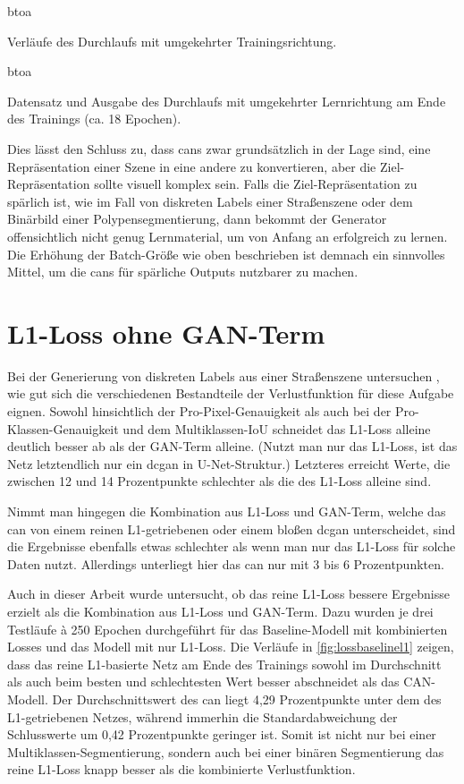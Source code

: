 \begin{losseswoiou}{btoa}
	\caption{Verläufe des Durchlaufs mit umgekehrter Trainingsrichtung.}
	\label{fig:lossbtoa}
\end{losseswoiou}

\begin{outputs}{btoa}
	\caption{Datensatz und Ausgabe des Durchlaufs mit umgekehrter Lernrichtung am Ende des Trainings (ca. 18 Epochen).}
	\label{fig:outputsbtoa}
\end{outputs}

Dies lässt den Schluss zu, dass \glspl{can} zwar grundsätzlich in der Lage sind, eine Repräsentation einer Szene in eine andere zu konvertieren, aber die Ziel-Repräsentation sollte visuell komplex sein.
Falls die Ziel-Repräsentation zu spärlich ist, wie im Fall von diskreten Labels einer Straßenszene oder dem Binärbild einer Polypensegmentierung, dann bekommt der Generator offensichtlich nicht genug Lernmaterial, um von Anfang an erfolgreich zu lernen.
Die Erhöhung der Batch-Größe wie oben beschrieben ist demnach ein sinnvolles Mittel, um die \glspl{can} für spärliche Outputs nutzbarer zu machen.



\section{L1-Loss ohne GAN-Term}

Bei der Generierung von diskreten Labels aus einer Straßenszene untersuchen \citeauthor{Isola.2017}, wie gut sich die verschiedenen Bestandteile der Verlustfunktion für diese Aufgabe eignen.
Sowohl hinsichtlich der Pro-Pixel-Genauigkeit als auch bei der Pro-Klassen-Genauigkeit und dem Multiklassen-IoU schneidet das L1-Loss alleine deutlich besser ab als der GAN-Term alleine.
(Nutzt man nur das L1-Loss, ist das Netz letztendlich nur ein \gls{dcgan} in U-Net-Struktur.)
Letzteres erreicht Werte, die zwischen 12 und 14 Prozentpunkte schlechter als die des L1-Loss alleine sind.

Nimmt man hingegen die Kombination aus L1-Loss und GAN-Term, welche das \gls{can} von einem reinen L1-getriebenen oder einem bloßen \gls{dcgan} unterscheidet, sind die Ergebnisse ebenfalls etwas schlechter als wenn man nur das L1-Loss für solche Daten nutzt.
Allerdings unterliegt hier das \gls{can} nur mit 3 bis 6 Prozentpunkten.

Auch in dieser Arbeit wurde untersucht, ob das reine L1-Loss bessere Ergebnisse erzielt als die Kombination aus L1-Loss und GAN-Term.
Dazu wurden je drei Testläufe à 250 Epochen durchgeführt für das Baseline-Modell mit kombinierten Losses und das Modell mit nur L1-Loss.
Die Verläufe in \autoref{fig:lossbaselinel1} zeigen, dass das reine L1-basierte Netz am Ende des Trainings sowohl im Durchschnitt als auch beim besten und schlechtesten Wert besser abschneidet als das CAN-Modell.
Der Durchschnittswert des \gls{can} liegt 4,29 Prozentpunkte unter dem des L1-getriebenen Netzes, während immerhin die Standardabweichung der Schlusswerte um 0,42 Prozentpunkte geringer ist.
Somit ist nicht nur bei einer Multiklassen-Segmentierung, sondern auch bei einer binären Segmentierung das reine L1-Loss knapp besser als die kombinierte Verlustfunktion.

